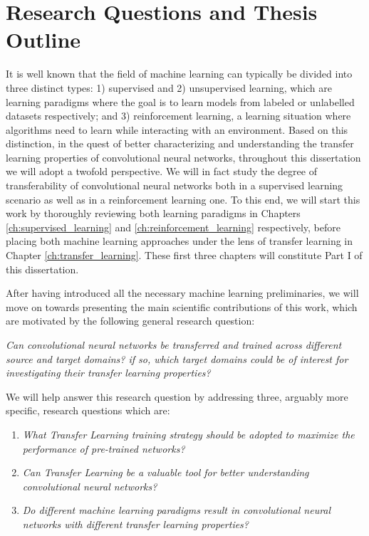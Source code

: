 \section*{Research Questions and Thesis Outline}
It is well known that the field of machine learning can typically be divided into three distinct types: 1) supervised and 2) unsupervised learning, which are learning paradigms where the goal is to learn models from labeled or unlabelled datasets respectively; and 3) reinforcement learning, a learning situation where algorithms need to learn while interacting with an environment. Based on this distinction, in the quest of better characterizing and understanding the transfer learning properties of convolutional neural networks, throughout this dissertation we will adopt a twofold perspective. We will in fact study the degree of transferability of convolutional neural networks both in a supervised learning scenario as well as in a reinforcement learning one. To this end, we will start this work by thoroughly reviewing both learning paradigms in Chapters \ref{ch:supervised_learning} and \ref{ch:reinforcement_learning} respectively, before placing both machine learning approaches under the lens of transfer learning in Chapter \ref{ch:transfer_learning}. These first three chapters will constitute Part I of this dissertation.

After having introduced all the necessary machine learning preliminaries, we will move on towards presenting the main scientific contributions of this work, which are motivated by the following general research question:
\begin{center}
	\textit{Can convolutional neural networks be transferred and trained across different source and target domains? if so, which target domains could be of interest for investigating their transfer learning properties?}	
\end{center}    

We will help answer this research question by addressing three, arguably more specific, research questions which are:
\begin{enumerate}
	\item \textit{What Transfer Learning training strategy should be adopted to maximize the performance of pre-trained networks?}

	\item \textit{Can Transfer Learning be a valuable tool for better understanding convolutional neural networks?}
	
	\item \textit{Do different machine learning paradigms result in convolutional neural networks with different transfer learning properties?}
\end{enumerate}

